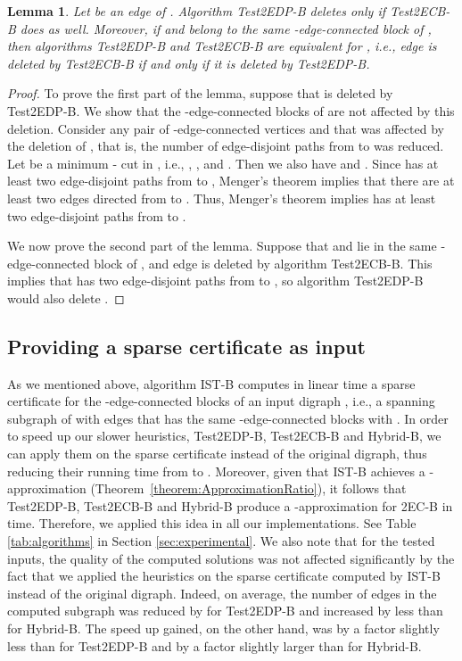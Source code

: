 \documentclass[11pt]{article}
\newtheorem{lemma}[theorem]{Lemma}
\begin{document}
\begin{lemma}
\label{lemma:Test2EDP-Test2ECB}
Let  be an edge of . Algorithm \textsf{Test2EDP-B} deletes  only if \textsf{Test2ECB-B} does as well.
Moreover, if   and  belong to the same -edge-connected block of , then algorithms \textsf{Test2EDP-B} and \textsf{Test2ECB-B} are equivalent for ,
i.e., edge  is deleted by \textsf{Test2ECB-B} if and only if it is deleted by \textsf{Test2EDP-B}.
\end{lemma}
\begin{proof}
To prove the first part of the lemma, suppose that  is deleted by \textsf{Test2EDP-B}. We show that the -edge-connected blocks of  are not affected by this deletion.
Consider any pair of -edge-connected vertices  and  that was affected by the deletion of , that is, the number of edge-disjoint paths from  to  was reduced.
Let  be a minimum - cut in , i.e., , ,  and .
Then we also have  and . Since   has at least two edge-disjoint paths from  to , Menger's theorem implies that there are at least two edges directed from  to .
Thus, Menger's theorem implies   has at least two edge-disjoint paths from  to .

We now prove the second part of the lemma. Suppose that  and  lie in the same -edge-connected block of , and edge  is deleted by algorithm \textsf{Test2ECB-B}.
This implies that  has two edge-disjoint paths from  to , so algorithm \textsf{Test2EDP-B} would also delete .
\end{proof}

\subsection{Providing a sparse certificate as input}
\label{sec:sparse-input}

As we mentioned above, algorithm \textsf{IST-B} computes in linear time a sparse certificate for the -edge-connected blocks of an input digraph , i.e., a spanning subgraph of  with  edges that has the same -edge-connected blocks with . In order to speed up our slower heuristics, \textsf{Test2EDP-B}, \textsf{Test2ECB-B} and \textsf{Hybrid-B}, we can apply them on the sparse certificate instead of the original digraph, thus reducing their running time from  to . Moreover, given that \textsf{IST-B} achieves a -approximation (Theorem~\ref{theorem:ApproximationRatio}), it follows that \textsf{Test2EDP-B}, \textsf{Test2ECB-B} and \textsf{Hybrid-B}
produce a -approximation for \textsf{2EC-B} in  time. Therefore, we applied this idea in all our implementations. See Table \ref{tab:algorithms} in Section \ref{sec:experimental}.
We also note that for the tested inputs, the quality of the computed solutions was not affected significantly
by the fact that we applied the heuristics on the sparse certificate computed by \textsf{IST-B} instead of the original digraph. Indeed, on average, the number of edges in the computed subgraph
was reduced by  for \textsf{Test2EDP-B} and increased by less than   for \textsf{Hybrid-B}. The speed up gained, on the other hand, was by a factor slightly less than  for \textsf{Test2EDP-B} and by a factor slightly larger than  for \textsf{Hybrid-B}.
\end{document}

